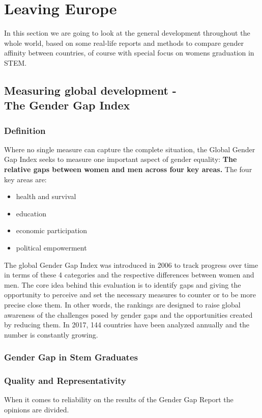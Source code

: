 	\section{Leaving Europe}
	In this section we are going to look at the general development throughout the whole world, based on some real-life reports and methods to compare gender affinity between countries, of course with special focus on womens graduation in STEM.
	
	\subsection{Measuring global development - \\The Gender Gap Index}
	
	\subsubsection{Definition}
	
	Where no single measure can capture the complete situation, the Global Gender Gap Index seeks to measure one important aspect of gender equality: \textbf{The relative gaps between women and men across four key areas.}
	The four key areas are: \cite{tgender}
	\begin{itemize}
		\item health and survival
		\item education
		\item economic participation
		\item political empowerment
	\end{itemize}
	The global Gender Gap Index was introduced in 2006 to track progress over time in terms of these 4 categories and the respective differences between women and men. The core idea behind this evaluation is to identify gaps and giving the opportunity to perceive and set the necessary measures to counter or to be more precise close them. In other words, the rankings are designed to raise global awareness of the challenges posed by gender gaps and the opportunities created by reducing them. In 2017, 144 countries have been analyzed annually and the number is constantly growing.
	
	\subsubsection{Gender Gap in Stem Graduates}
	
	
	
	\subsubsection{Quality and Representativity}
	When it comes to reliability on the results of the Gender Gap Report the opinions are divided. 
	

